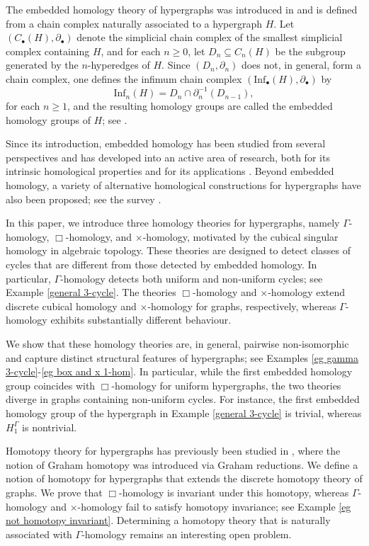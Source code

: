 \documentclass[11pt]{amsart}
\begin{document}
The embedded homology theory of hypergraphs was introduced in \linebreak \cite{HG_Bressan} and is defined from a chain complex naturally associated to a hypergraph $H$. Let $(C_\bullet(H),\partial_\bullet)$ denote the simplicial chain complex of the smallest simplicial complex containing $H$, and for each $n\geq 0$, let $D_n\subseteq C_n(H)$ be the subgroup generated by the $n$-hyperedges of $H$. Since $(D_n,\partial_n)$ does not, in general, form a chain complex, one defines the infimum chain complex $(\mathrm{Inf}_\bullet(H),\partial_\bullet)$ by
\[
\mathrm{Inf}_n(H)=D_n\cap \partial_n^{-1}(D_{n-1}),
\]
for each $n\geq 1$, and the resulting homology groups are called the embedded homology groups of $H$; see \cite{HG_Bressan}.

Since its introduction, embedded homology has been studied from several perspectives and has developed into an active area of research, both for its intrinsic homological properties and for its applications \cite{HG_Gaspar26,HG_Liu24,HG_Ren26,HG_Valentiner26}. Beyond embedded homology, a variety of alternative homological constructions for hypergraphs have also been proposed; see the survey \cite{HG_Gaspar26}.

In this paper, we introduce three homology theories for hypergraphs, namely $\Gamma$-homology, $\Box$-homology, and $\times$-homology, motivated by the cubical singular homology in algebraic topology. These theories are designed to detect classes of cycles that are different from those detected by embedded homology. In particular, $\Gamma$-homology detects both uniform and non-uniform cycles; see Example \ref{general 3-cycle}. The theories $\Box$-homology and $\times$-homology extend discrete cubical homology and $\times$-homology for graphs, respectively, whereas $\Gamma$-homology exhibits substantially different behaviour.

We show that these homology theories are, in general, pairwise non-isomorphic and capture distinct structural features of hypergraphs; see Examples \ref{eg gamma 3-cycle}-\ref{eg box and x 1-hom}. In particular, while the first embedded homology group coincides with $\Box$-homology for uniform hypergraphs, the two theories diverge in graphs containing non-uniform cycles. For instance, the first embedded homology group of the hypergraph in Example \ref{general 3-cycle} is trivial, whereas $H_1^\Gamma$ is nontrivial.

 Homotopy theory for hypergraphs has previously been studied in \cite{HG_Chen01}, where the notion of Graham homotopy was introduced via Graham reductions. We define a notion of homotopy for hypergraphs that extends the discrete homotopy theory of graphs. We prove that $\Box$-homology is invariant under this homotopy, whereas $\Gamma$-homology and $\times$-homology fail to satisfy homotopy invariance; see Example \ref{eg not homotopy invariant}. Determining a homotopy theory that is naturally associated with $\Gamma$-homology remains an interesting open problem.
\end{document}
